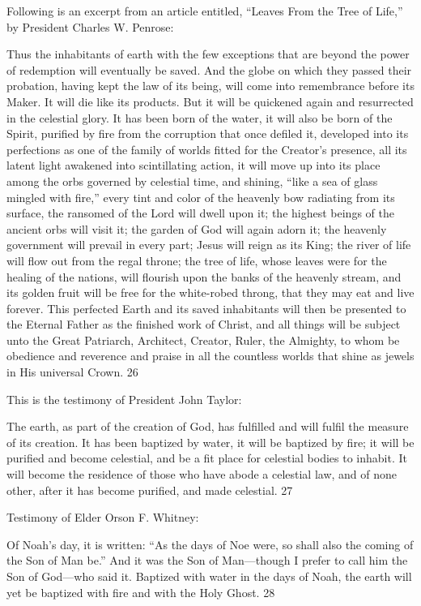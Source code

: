 Following is an excerpt from an article entitled, ``Leaves From the Tree of Life,'' by President
Charles W. Penrose:

Thus the inhabitants of earth with the few exceptions that are beyond the power of
redemption will eventually be saved. And the globe on which they passed their probation,
having kept the law of its being, will come into remembrance before its Maker. It will die
like its products. But it will be quickened again and resurrected in the celestial glory. It has
been born of the water, it will also be born of the Spirit, purified by fire from the corruption
that once defiled it, developed into its perfections as one of the family of worlds fitted for the
Creator's presence, all its latent light awakened into scintillating action, it will move up into
its place among the orbs governed by celestial time, and shining, ``like a sea of glass mingled
with fire,'' every tint and color of the heavenly bow radiating from its surface, the ransomed
of the Lord will dwell upon it; the highest beings of the ancient orbs will visit it; the garden
of God will again adorn it; the heavenly government will prevail in every part; Jesus will
reign as its King; the river of life will flow out from the regal throne; the tree of life, whose
leaves were for the healing of the nations, will flourish upon the banks of the heavenly
stream, and its golden fruit will be free for the white-robed throng, that they may eat and live
forever. This perfected Earth and its saved inhabitants will then be presented to the Eternal
Father as the finished work of Christ, and all things will be subject unto the Great Patriarch,
Architect, Creator, Ruler, the Almighty, to whom be obedience and reverence and praise in
all the countless worlds that shine as jewels in His universal Crown. 26

This is the testimony of President John Taylor:

The earth, as part of the creation of God, has fulfilled and will fulfil the measure of its
creation. It has been baptized by water, it will be baptized by fire; it will be purified and
become celestial, and be a fit place for celestial bodies to inhabit. It will become the
residence of those who have abode a celestial law, and of none other, after it has become
purified, and made celestial. 27

Testimony of Elder Orson F. Whitney:

Of Noah's day, it is written: ``As the days of Noe were, so shall also the coming of the Son of
Man be.'' And it was the Son of Man—though I prefer to call him the Son of God—who said
it. Baptized with water in the days of Noah, the earth will yet be baptized with fire and with
the Holy Ghost. 28

